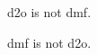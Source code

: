 \documentclass[a4paper,12pt,oneside]{book}
\newcommand{\wordcount}{
\clearpage\thispagestyle{empty}

}
\begin{document}
\Blinddocument
\Blinddocument

\ac{d2o} is not \ac{dmf}.

\ac{dmf} is not \ac{d2o}.

%

%
%
\singlespacing{\wordcount}
\end{document}

